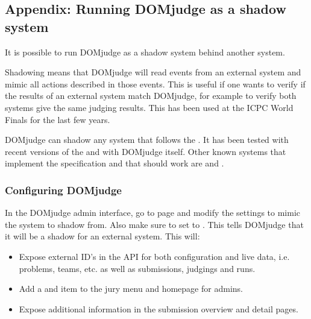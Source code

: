 \documentclass[a4paper,10pt,english,openany]{sphinxmanual}
\begin{document}
\sphinxstepscope


\subsection{Appendix: Running DOMjudge as a shadow system}
\label{\detokenize{shadow:appendix-running-domjudge-as-a-shadow-system}}\label{\detokenize{shadow::doc}}
\sphinxAtStartPar
It is possible to run DOMjudge as a shadow system behind another system.

\sphinxAtStartPar
Shadowing means that DOMjudge will read events from an external system and mimic
all actions described in those events. This is useful if one wants to verify if
the results of an external system match DOMjudge, for example to verify both
systems give the same judging results. This has been used at the ICPC World
Finals for the last few years.

\sphinxAtStartPar
DOMjudge can shadow any system that follows the .
It has been tested with recent versions of the 
and with DOMjudge itself. Other known systems that implement the specification
and that should work are  and .


\subsubsection{Configuring DOMjudge}
\label{\detokenize{shadow:configuring-domjudge}}
\sphinxAtStartPar
In the DOMjudge admin interface, go to  page and modify
the settings to mimic the system to shadow from. Also make sure to set
 to . This tells DOMjudge
that it will be a shadow for an external system. This will:
\begin{itemize}
\item {} 
\sphinxAtStartPar
Expose external ID’s in the API for both configuration and live data, i.e.
problems, teams, etc. as well as submissions, judgings and runs.

\item {} 
\sphinxAtStartPar
Add a  and  item to the jury
menu and homepage for admins.

\item {} 
\sphinxAtStartPar
Expose additional information in the submission overview and detail pages.

\end{itemize}
\end{document}
